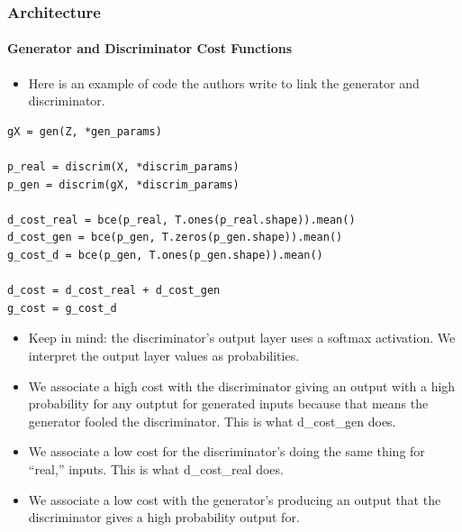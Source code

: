 \documentclass{beamer}
\begin{document}
\begin{frame}[fragile]
\frametitle{Architecture}
\framesubtitle{Generator and Discriminator Cost Functions}
\begin{footnotesize}
\begin{itemize}
\item Here is an example of code the authors write to link the generator and
  discriminator.  
\end{itemize}
\end{footnotesize}
\begin{tiny}
\begin{lstlisting}
gX = gen(Z, *gen_params)

p_real = discrim(X, *discrim_params)
p_gen = discrim(gX, *discrim_params)

d_cost_real = bce(p_real, T.ones(p_real.shape)).mean()
d_cost_gen = bce(p_gen, T.zeros(p_gen.shape)).mean()
g_cost_d = bce(p_gen, T.ones(p_gen.shape)).mean()

d_cost = d_cost_real + d_cost_gen
g_cost = g_cost_d
\end{lstlisting}
\end{tiny}
\begin{footnotesize}
\begin{itemize}
\item Keep in mind: the discriminator's output layer uses a softmax activation.
  We interpret the output layer values as probabilities.

\item  We associate a high cost with the discriminator giving an output
with a high probability for any outptut for generated inputs because that means
the generator fooled the discriminator.  This is what d\_cost\_gen does.

\item We associate a low cost for the discriminator's doing the same thing for
``real,'' inputs.  This is what d\_cost\_real does.

\item We associate a low cost with the generator's producing an output that the 
  discriminator gives a high probability output for.

\end{itemize}
\end{footnotesize}
\end{frame}
\end{document}
